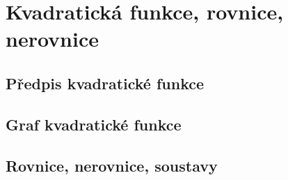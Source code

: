 
\newpage
    \section{Kvadratická funkce, rovnice, nerovnice}

        \subsection{Předpis kvadratické funkce}
        \subsection{Graf kvadratické funkce}
        \subsection{Rovnice, nerovnice, soustavy}